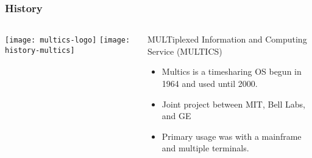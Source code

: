 


\begin{frame}[plain]
	\frametitle{History}
	
	
	
	\begin{columns}
		
		\begin{column}{.5\textwidth}
			\texttt{[image: multics-logo]}
			\texttt{[image: history-multics]}


			
		\end{column}
		
		\begin{column}{.5\textwidth}
			
			\large
			MULTiplexed Information and Computing Service (MULTICS)
			\begin{itemize}
				\item Multics is a timesharing OS begun in 1964
				and used until 2000.
				
				\item  Joint project between MIT, Bell Labs, and GE
				
				\item  Primary usage was with a mainframe and
				multiple terminals.
				

			\end{itemize}	
			
		\end{column}
		
		
	\end{columns}
	
	
\end{frame}



